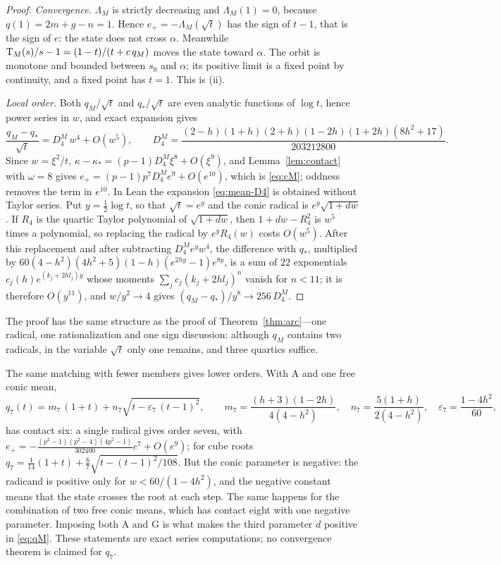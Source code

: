 \begin{proof}
\emph{Convergence.} $\Lambda_M$ is strictly decreasing and $\Lambda_M(1)=0$, because
$q(1)=2m+g-n=1$. Hence $e_+=-\Lambda_M(\sqrt t)$ has the sign of $t-1$, that is the sign of $e$: the
state does not cross $\alpha$. Meanwhile $\mathrm{T}_M(s)/s-1=(1-t)/(t+c\,q_M)$ moves the state toward
$\alpha$. The orbit is monotone and bounded between $s_0$ and $\alpha$; its positive limit is a fixed
point by continuity, and a fixed point has $t=1$. This is (ii).

\emph{Local order.} Both $q_M/\sqrt t$ and $q_*/\sqrt t$ are even analytic functions of $\log t$, hence
power series in $w$, and exact expansion gives
\begin{equation}\label{eq:mean-D4}
\frac{q_M-q_*}{\sqrt t}=D_4^{M}\,w^{4}+O(w^{5}),\qquad
D_4^{M}=\frac{(2-h)(1+h)(2+h)(1-2h)(1+2h)(8h^{2}+17)}{203212800} .
\end{equation}
Since $w=\xi^{2}/t$, $\kappa-\kappa_*=(p-1)D_4^{M}\xi^{8}+O(\xi^{9})$, and Lemma~\ref{lem:contact} with
$\omega=8$ gives $e_+=(p-1)p^{7}D_4^{M}e^{9}+O(e^{10})$, which is \eqref{eq:cM}; oddness removes the
term in $e^{10}$. In Lean the expansion \eqref{eq:mean-D4} is obtained without Taylor series. Put
$y=\tfrac12\log t$, so that $\sqrt t=e^{y}$ and the conic radical is $e^{y}\sqrt{1+dw}$. If $R_4$ is the
quartic Taylor polynomial of $\sqrt{1+dw}$, then $1+dw-R_4^{2}$ is $w^{5}$ times a polynomial, so
replacing the radical by $e^{y}R_4(w)$ costs $O(w^{5})$. After this replacement and after subtracting
$D_4^{M}e^{y}w^{4}$, the difference with $q_*$, multiplied by
$60(4-h^{2})(4h^{2}+5)(1-h)(e^{2hy}-1)e^{8y}$, is a sum of $22$ exponentials $c_j(h)e^{(k_j+2hl_j)y}$
whose moments $\sum_jc_j(k_j+2hl_j)^{n}$ vanish for $n<11$; it is therefore $O(y^{11})$, and
$w/y^{2}\to4$ gives $(q_M-q_*)/y^{8}\to256\,D_4^{M}$.
\end{proof}

The proof has the same structure as the proof of Theorem~\ref{thm:arc}---one radical, one rationalization
and one sign discussion: although $q_M$ contains two radicals, in the variable $\sqrt t$ only one remains,
and three quartics suffice.

\begin{remark}\label{rem:family}
The same matching with fewer members gives lower orders. With $\mathrm A$ and one free conic mean,
\[ q_7(t)=m_7\,(1+t)+n_7\sqrt{t-\varepsilon_7\,(t-1)^{2}},\qquad
m_7=\frac{(h+3)(1-2h)}{4(4-h^{2})},\quad n_7=\frac{5(1+h)}{2(4-h^{2})},\quad
\varepsilon_7=\frac{1-4h^{2}}{60}, \]
has contact six: a single radical gives order seven, with
$e_+=-\tfrac{(p^{2}-1)(p^{2}-4)(4p^{2}-1)}{302400}e^{7}+O(e^{9})$; for cube roots
$q_7=\tfrac1{14}(1+t)+\tfrac67\sqrt{t-(t-1)^{2}/108}$. But the conic parameter is negative: the radicand
is positive only for $w<60/(1-4h^{2})$, and the negative constant means that the state crosses the root
at each step. The same happens for the combination of two free conic means, which has contact eight
with one negative parameter. Imposing both $\mathrm A$ and $\mathrm G$ is what makes the third
parameter $d$ positive in \eqref{eq:qM}. These statements are exact series computations; no
convergence theorem is claimed for $q_7$.
\end{remark}
